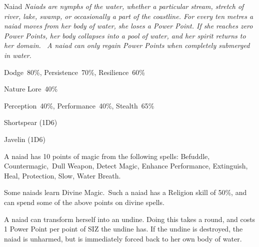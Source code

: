 \begin{monsterbox}{Naiad}
	\textit{Naiads are nymphs of the water, whether a particular stream, stretch of river, lake, swamp, or occasionally a part of the coastline. For every ten metres a naiad moves from her body of water, she loses a Power Point. If she reaches zero Power Points, her body collapses into a pool of water, and her spirit returns to her domain.  A naiad can only regain Power Points when completely submerged in water.}\\
	\rpghline
	\basics[%
        hitpoints  = 10, 
	majorwound = 5,
	damagemodifier = 0,
	powerpoints = 25,
	movementrate = 15m,
	armor = None,
	plunderrating = 1
	]
	\rpghline%
	\stats[ %
		STR = 4D6    (14),
		CON = 3D6    (11),
		DEX = 4D6    (14),
		SIZ = 2D6+3  (10),
		INT = 3D6+6  (17),
		POW = 2D6+18 (25),
		CHA = 2D6+12 (19)
	]
	\rpghline%
	\begin{rpg-monsteraction}[Resistances]
		Dodge~80\%, Persistence~70\%, Resilience~60\%
	\end{rpg-monsteraction}
	\begin{rpg-monsteraction}[Knowledge]
		Nature Lore~40\%
	\end{rpg-monsteraction}
	\begin{rpg-monsteraction}[Practical]
		Perception~40\%, Performance~40\%, Stealth~65\%
	\end{rpg-monsteraction}
	\begin{rpg-monsteraction}
		Shortspear (1D6)
	\end{rpg-monsteraction}
	\begin{rpg-monsteraction}
		Javelin (1D6)
	\end{rpg-monsteraction}
	\begin{rpg-monsteraction}
		A naiad has 10 points of magic from the following spells: Befuddle, Countermagic, Dull Weapon, Detect Magic, Enhance Performance, Extinguish, Heal, Protection, Slow, Water Breath.
	\end{rpg-monsteraction}
	\begin{rpg-monsteraction}
		Some naiads learn Divine Magic. Such a naiad has a Religion skill of 50\%, and can spend some of the above points on divine spells.
	\end{rpg-monsteraction}
	\begin{rpg-monsteraction}
		A naiad can transform herself into an undine. Doing this takes a round, and costs 1 Power Point per point of SIZ the undine has. If the undine is destroyed, the naiad is unharmed, but is immediately forced back to her own body of water.
	\end{rpg-monsteraction}

\end{monsterbox}

